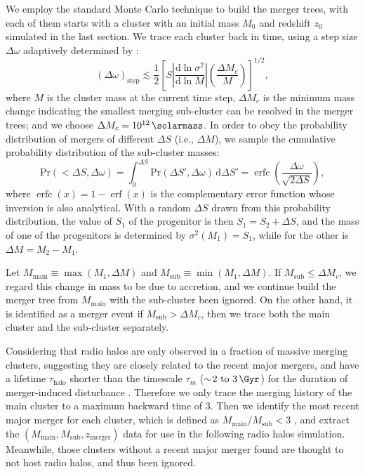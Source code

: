 \documentclass[modern]{aastex61}
\newcommand{\R}[1]{\mathrm{#1}}
\newcommand{\D}[1]{\R{d} #1}
\newcommand{\diff}[2]{\frac{\D{#1}}{\D{#2}}}
\DeclareMathOperator{\erf}{erf}
\DeclareMathOperator{\erfc}{erfc}
\begin{document}
We employ the standard Monte Carlo technique to build the merger trees,
with each of them starts with a cluster with an initial mass $M_0$
and redshift $z_0$ simulated in the last section.
We trace each cluster back in time, using a step size $\Delta\omega$
adaptively determined by \citep{randall2002}:
\begin{equation}
  \label{sec:dw-step}
  (\Delta\omega)_{\R{step}} \lesssim \frac{1}{2} \left[
    S \left| \diff{\ln \sigma^2}{\ln M} \right|
    \left( \frac{\Delta M_c}{M} \right) \right]^{1/2},
\end{equation}
where $M$ is the cluster mass at the current time step,
$\Delta M_c$ is the minimum mass change indicating the smallest
merging sub-cluster can be resolved in the merger trees;
and we choose $\Delta M_c = \SI{e12}{\solarmass}$.
In order to obey the probability distribution of mergers of different
$\Delta S$ (i.e., $\Delta M$), we sample the cumulative probability
distribution of the sub-cluster masses:
\begin{equation}
  \label{sec:cdf-sub-masses}
  \R{Pr}(<\!\Delta S, \Delta\omega) =
  \int_0^{\Delta S} \R{Pr}(\Delta S', \Delta\omega) \,\D{\Delta S'} =
  \erfc \!\left( \frac{\Delta \omega}{\sqrt{2 \Delta S}} \right),
\end{equation}
where $\erfc(x) = 1 - \erf(x)$ is the complementary error
function whose inversion is also analytical.
With a random $\Delta S$ drawn from this probability distribution,
the value of $S_1$ of the progenitor is then $S_1 = S_2 + \Delta S$,
and the mass of one of the progenitors is determined by
$\sigma^2(M_1) = S_1$, while for the other is $\Delta M = M_2 - M_1$.

Let $M_{\R{main}} \equiv \max(M_1, \Delta M)$ and
$M_{\R{sub}} \equiv \min(M_1, \Delta M)$.
If $M_{\R{sub}} \leq \Delta M_c$, we regard this change in mass
to be due to accretion, and we continue build the merger tree from
$M_{\R{main}}$ with the sub-cluster been ignored.
On the other hand, it is identified as a merger event if
$M_{\R{sub}} > \Delta M_c$, then we trace both the main cluster
and the sub-cluster separately.

Considering that radio halos are only observed in
a fraction of massive merging clusters, suggesting they are closely
related to the recent major mergers, and have a lifetime
$\tau_{\R{halo}}$ shorter than the timescale
$\tau_m$ ($\sim\! \SIrange[range-units=single]{2}{3}{\Gyr}$)
for the duration of merger-induced disturbance \citep{cassano2016}.
Therefore we only trace the merging history of the main cluster
to a maximum backward time of \SI{3}{\Gyr}.
Then we identify the most recent major merger for each cluster,
which is defined as $M_{\R{main}}/M_{\R{sub}} < 3$
\citep[e.g.,][]{wetzel2009},
and extract the $(M_{\R{main}}, M_{\R{sub}}, z_{\R{merger}})$
data for use in the following radio halos simulation.
Meanwhile, those clusters without a recent major merger found
are thought to not host radio halos, and thus been ignored.
\end{document}
